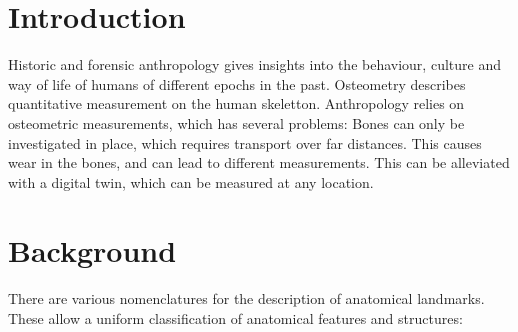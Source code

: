 \documentclass[sw]{iosart2x}
\newcommand{\aw}{AnthroWorks3D}
\begin{document}
\begin{frontmatter}
\begin{abstract}
Anthropology relies on osteometric measurements of human bones, but ...
In this paper, first, we describe the anthropology domain.
Then, we discuss design decisions of modelling ANNO.
Next, we show how ANNO is published for the community.
Finally, we describe the integration of the ontology into \aw{}.
\end{abstract}

\begin{keyword}
\end{keyword}

\end{frontmatter}






\section{Introduction}\label{sec:introduction}
Historic and forensic anthropology gives insights into the behaviour, culture and way of life of humans of different epochs in the past.
Osteometry describes quantitative measurement on the human skeletton.
Anthropology relies on osteometric measurements, which has several problems:
Bones can only be investigated in place, which requires transport over far distances.
This causes wear in the bones, and can lead to different measurements.
This can be alleviated with a digital twin, which can be measured at any location.

\section{Background}
There are various nomenclatures for the description of anatomical landmarks.
These allow a uniform classification of anatomical features and structures:
\end{document}
